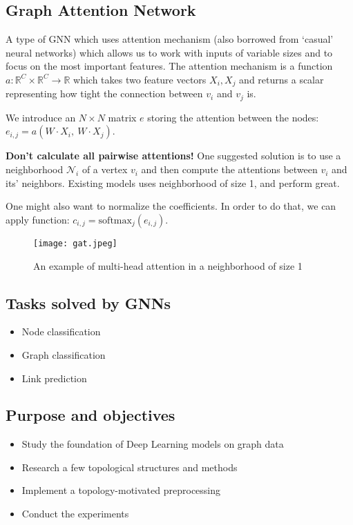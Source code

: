 \subsection{Graph Attention Network}
\begin{frame}[allowframebreaks]{\subsecname}
	A type of GNN which uses attention mechanism (also borrowed from `casual' neural networks) which allows us to work with inputs of variable sizes and to focus on the most important features.
	The attention mechanism is a function $a: \mathbb{R}^C \times \mathbb{R}^C \rightarrow \mathbb{R}$ which takes two feature vectors $X_i, X_j$ and returns a scalar representing how tight the connection between $v_i$ and $v_j$ is.

	\framebreak

	We introduce an $N \times N$ matrix $e$ storing the attention between the nodes: $e_{i, j} = a\left( W \cdot X_i,\ W \cdot X_j \right)$.

	\textbf{Don't calculate all pairwise attentions!}
	One suggested solution is to use a neighborhood $\mathcal{N}_i$ of a vertex $v_i$ and then compute the attentions between $v_i$ and its' neighbors.
	Existing models uses neighborhood of size 1, and perform great.

	One might also want to normalize the coefficients.
	In order to do that, we can apply  function: $c_{i, j} = \text{softmax}_j \left( e_{i, j} \right)$.

	\begin{figure}[h]
		\centering
		\texttt{[image: gat.jpeg]}
		\caption{An example of multi-head attention in a neighborhood of size 1}
	\end{figure}
\end{frame}

\subsection{Tasks solved by GNNs}
\begin{frame}{\subsecname}
	\begin{itemize}
		\item Node classification
		\item Graph classification
		\item Link prediction
	\end{itemize}
\end{frame}

\subsection{Purpose and objectives}
\begin{frame}{\subsecname}
	\begin{itemize}
		\item Study the foundation of Deep Learning models on graph data
		\item Research a few topological structures and methods
		\item Implement a topology-motivated preprocessing
		\item Conduct the experiments
	\end{itemize}
\end{frame}

